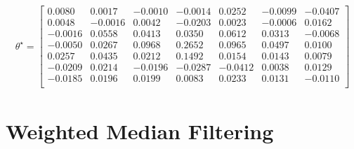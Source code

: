 \documentclass{article}
\begin{document}
	\begin{align*}
		\theta^{\star} =
		\begin{bmatrix}
			0.0080 &  0.0017 & -0.0010 & -0.0014 &  0.0252 & -0.0099 & -0.0407 \\
			0.0048 & -0.0016 &  0.0042 & -0.0203 &  0.0023 & -0.0006 &  0.0162 \\
		   -0.0016 &  0.0558 &  0.0413 &  0.0350 &  0.0612 &  0.0313 & -0.0068 \\
		   -0.0050 &  0.0267 &  0.0968 &  0.2652 &  0.0965 &  0.0497 &  0.0100 \\
			0.0257 &  0.0435 &  0.0212 &  0.1492 &  0.0154 &  0.0143 &  0.0079 \\
		   -0.0209 &  0.0214 & -0.0196 & -0.0287 & -0.0412 &  0.0038 &  0.0129 \\
		   -0.0185 &  0.0196 &  0.0199 &  0.0083 &  0.0233 &  0.0131 & -0.0110 \\
		\end{bmatrix}
	\end{align*}
	
\section{Weighted Median Filtering}
\end{document}
